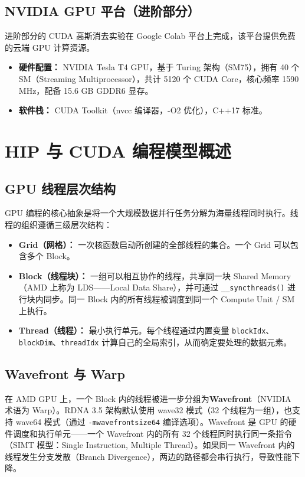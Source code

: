 \documentclass[a4paper]{article}
\begin{document}
\subsection{NVIDIA GPU 平台（进阶部分）}

进阶部分的 CUDA 高斯消去实验在 Google Colab 平台上完成，该平台提供免费的云端 GPU 计算资源。

\begin{itemize}
    \item \textbf{硬件配置：} NVIDIA Tesla T4 GPU，基于 Turing 架构（SM75），拥有 40 个 SM（Streaming Multiprocessor），共计 5120 个 CUDA Core，核心频率 1590 MHz，配备 15.6 GB GDDR6 显存。
    \item \textbf{软件栈：} CUDA Toolkit（nvcc 编译器，-O2 优化），C++17 标准。
\end{itemize}

\section{HIP 与 CUDA 编程模型概述}

\subsection{GPU 线程层次结构}

GPU 编程的核心抽象是将一个大规模数据并行任务分解为海量线程同时执行。线程的组织遵循三级层次结构：

\begin{itemize}
    \item \textbf{Grid（网格）：} 一次核函数启动所创建的全部线程的集合。一个 Grid 可以包含多个 Block。
    \item \textbf{Block（线程块）：} 一组可以相互协作的线程，共享同一块 Shared Memory（AMD 上称为 LDS——Local Data Share），并可通过 \texttt{\_\_syncthreads()} 进行块内同步。同一 Block 内的所有线程被调度到同一个 Compute Unit / SM 上执行。
    \item \textbf{Thread（线程）：} 最小执行单元。每个线程通过内置变量 \texttt{blockIdx}、\texttt{blockDim}、\texttt{threadIdx} 计算自己的全局索引，从而确定要处理的数据元素。
\end{itemize}

\subsection{Wavefront 与 Warp}

在 AMD GPU 上，一个 Block 内的线程被进一步分组为\textbf{Wavefront}（NVIDIA 术语为 Warp）。RDNA 3.5 架构默认使用 wave32 模式（32 个线程为一组），也支持 wave64 模式（通过 \texttt{-mwavefrontsize64} 编译选项）。Wavefront 是 GPU 的硬件调度和执行单元——一个 Wavefront 内的所有 32 个线程同时执行同一条指令（SIMT 模型：Single Instruction, Multiple Thread）。如果同一 Wavefront 内的线程发生分支发散（Branch Divergence），两边的路径都会串行执行，导致性能下降。
\end{document}
